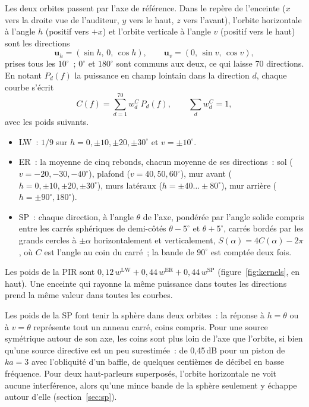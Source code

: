 \documentclass[11pt,a4paper]{article}
\newcommand{\vect}[1]{\mathbf{#1}}
\begin{document}
Les deux orbites passent par l'axe de référence. Dans le repère de l'enceinte ($x$ vers la droite vue
de l'auditeur, $y$ vers le haut, $z$ vers l'avant), l'orbite horizontale à l'angle $h$ (positif vers
$+x$) et l'orbite verticale à l'angle $v$ (positif vers le haut) sont les directions
\begin{equation}
\vect u_h = (\sin h,\,0,\,\cos h), \qquad \vect u_v = (0,\,\sin v,\,\cos v),
\end{equation}
prises tous les $10^\circ$~; $0^\circ$ et $180^\circ$ sont communs aux deux, ce qui laisse 70 directions. En
notant $P_d(f)$ la puissance en champ lointain dans la direction $d$, chaque courbe s'écrit
\begin{equation}
C(f) = \sum_{d=1}^{70} w^C_d\,P_d(f), \qquad \sum_d w^C_d = 1,
\end{equation}
avec les poids suivants.
\begin{itemize}
\item LW~: $1/9$ sur $h = 0, \pm10, \pm20, \pm30^\circ$ et $v = \pm10^\circ$.
\item ER~: la moyenne de cinq rebonds, chacun moyenne de ses directions~: sol ($v = -20, -30, -40^\circ$),
plafond ($v = 40, 50, 60^\circ$), mur avant ($h = 0, \pm10, \pm20, \pm30^\circ$), murs latéraux
($h = \pm40 \ldots \pm80^\circ$), mur arrière ($h = \pm90^\circ, 180^\circ$).
\item SP~: chaque direction, à l'angle $\theta$ de l'axe, pondérée par l'angle solide compris entre les
\og carrés sphériques\fg{} de demi-côtés $\theta - 5^\circ$ et $\theta + 5^\circ$, carrés bordés par les grands
cercles à $\pm\alpha$ horizontalement et verticalement, $S(\alpha) = 4C(\alpha) - 2\pi$, où $C$ est l'angle
au coin du carré~; la bande de $90^\circ$ est comptée deux fois.
\end{itemize}
Les poids de la PIR sont $0,12\,w^{\mathrm{LW}} + 0,44\,w^{\mathrm{ER}} + 0,44\,w^{\mathrm{SP}}$
(figure~\ref{fig:kernels}, en haut). Une enceinte qui rayonne la même puissance dans toutes les directions
prend la même valeur dans toutes les courbes.

Les poids de la SP font tenir la sphère dans deux orbites~: la réponse à $h = \theta$ ou à $v = \theta$
représente tout un anneau carré, coins compris. Pour une source symétrique autour de son axe, les coins
sont plus loin de l'axe que l'orbite, si bien qu'une source directive est un peu surestimée~: de
0,45\,dB pour un piston de $ka = 3$ avec l'obliquité d'un baffle, de quelques centièmes de décibel en
basse fréquence. Pour deux haut-parleurs superposés, l'orbite horizontale ne voit aucune
interférence, alors qu'une mince bande de la sphère seulement y échappe autour d'elle
(section~\ref{sec:sp}).
\end{document}
